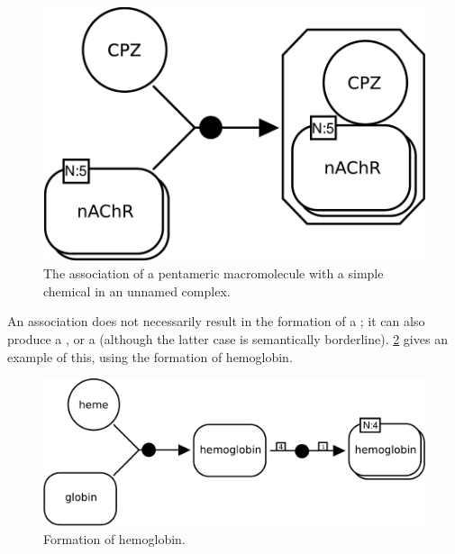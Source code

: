 \begin{figure}[H]
  \centering
  \includegraphics[scale = 0.3]{examples/association-unamed}
  \caption{The association of a pentameric macromolecule with a simple chemical in an unnamed complex.}
  \label{fig:assoc-unamed}
\end{figure}

An association does not necessarily result in the formation of a ; it can also produce a , or a  (although the latter case is semantically borderline).  \ref{fig:assoc-multi} gives an example of this, using the formation of hemoglobin.

\begin{figure}[H]
  \centering
  \includegraphics[scale = 0.3]{examples/association-multimerisation}
  \caption{Formation of hemoglobin.}
  \label{fig:assoc-multi}
\end{figure}





